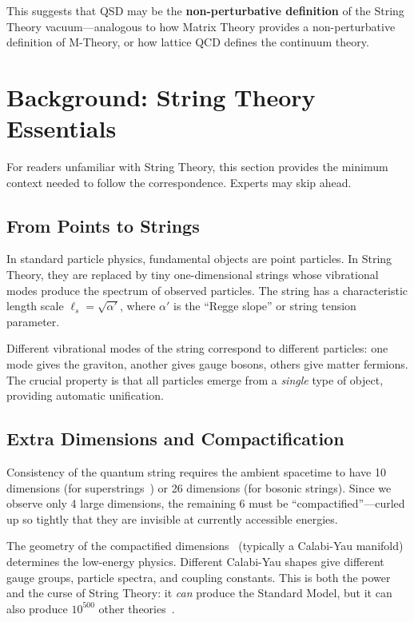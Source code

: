 \documentclass[11pt,a4paper]{article}
\theoremstyle{definition}
\newcommand{\ap}{\alpha'}
\newcommand{\ls}{\ell_s}
\begin{document}
This suggests that QSD may be the \textbf{non-perturbative definition} of
the String Theory vacuum---analogous to how Matrix Theory provides a
non-perturbative definition of M-Theory, or how lattice QCD defines the
continuum theory.


\section{Background: String Theory Essentials}
\label{sec:background}

For readers unfamiliar with String Theory, this section provides the
minimum context needed to follow the correspondence.  Experts may skip
ahead.

\subsection{From Points to Strings}

In standard particle physics, fundamental objects are point particles.  In
String Theory, they are replaced by tiny one-dimensional strings whose
vibrational modes produce the spectrum of observed particles.  The string
has a characteristic length scale $\ls = \sqrt{\ap}$, where $\ap$ is the
``Regge slope'' or string tension parameter.

Different vibrational modes of the string correspond to different
particles: one mode gives the graviton, another gives gauge bosons,
others give matter fermions.  The crucial property is that all particles
emerge from a \emph{single} type of object, providing automatic
unification.

\subsection{Extra Dimensions and Compactification}

Consistency of the quantum string requires the ambient spacetime to have
10 dimensions (for superstrings~\cite{Polchinski1998v1}) or 26 dimensions (for bosonic strings).
Since we observe only 4 large dimensions, the remaining 6 must be
``compactified''---curled up so tightly that they are invisible at
currently accessible energies.

The geometry of the compactified dimensions~\cite{Candelas1985} (typically a Calabi-Yau
manifold) determines the low-energy physics.  Different Calabi-Yau shapes
give different gauge groups, particle spectra, and coupling constants.
This is both the power and the curse of String Theory: it \emph{can}
produce the Standard Model, but it can also produce $10^{500}$ other
theories~\cite{Susskind2003,Vafa2005}.
\end{document}
